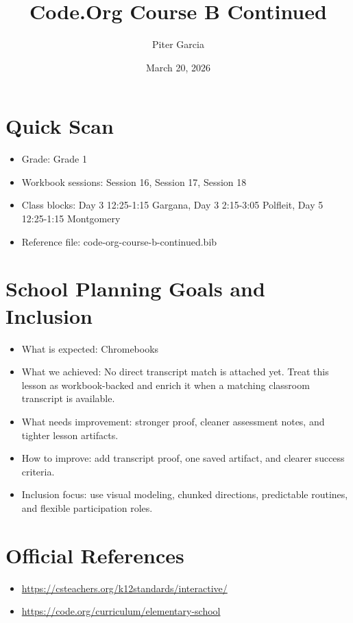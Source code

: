 \documentclass[11pt]{article}
\title{Code.Org Course B Continued}
\author{Piter Garcia}
\date{March 20, 2026}
\begin{document}
    \maketitle
    \section*{Quick Scan}
    \begin{itemize}[leftmargin=*]
    \item Grade: Grade 1
    \item Workbook sessions: Session 16, Session 17, Session 18
    \item Class blocks: Day 3 12:25-1:15 Gargana, Day 3 2:15-3:05 Polfleit, Day 5 12:25-1:15 Montgomery
    \item Reference file: code-org-course-b-continued.bib
    \end{itemize}
    \section*{School Planning Goals and Inclusion}
    \begin{itemize}[leftmargin=*]
    \item What is expected: Chromebooks
    \item What we achieved: No direct transcript match is attached yet. Treat this lesson as workbook-backed and enrich it when a matching classroom transcript is available.
    \item What needs improvement: stronger proof, cleaner assessment notes, and tighter lesson artifacts.
    \item How to improve: add transcript proof, one saved artifact, and clearer success criteria.
    \item Inclusion focus: use visual modeling, chunked directions, predictable routines, and flexible participation roles.
    \end{itemize}
    \section*{Official References}
    \begin{itemize}[leftmargin=*]
    \item \url{https://csteachers.org/k12standards/interactive/}
\item \url{https://code.org/curriculum/elementary-school}

    \end{itemize}
    
\end{document}
